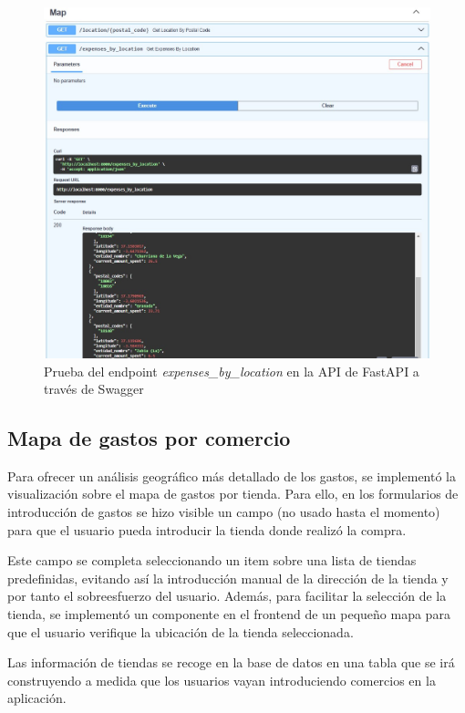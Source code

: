 \begin{figure}[ht!]
    \centering
    \includegraphics[width=\linewidth]{imagenes/api-expenses_by_location.jpg}
    \caption{Prueba del endpoint \textit{expenses\_by\_location} en la API de FastAPI a través de Swagger}
    \label{fig:api-expenses_by_location}
\end{figure}

\subsection{Mapa de gastos por comercio}
Para ofrecer un análisis geográfico más detallado de los gastos, se implementó la visualización sobre el mapa de gastos por tienda. Para ello, en los formularios de introducción de gastos se hizo visible un campo (no usado hasta el momento) para que el usuario pueda introducir la tienda donde realizó la compra. 

Este campo se completa seleccionando un item sobre una lista de tiendas predefinidas, evitando así la introducción manual de la dirección de la tienda y por tanto el sobreesfuerzo del usuario. Además, para facilitar la selección de la tienda, se implementó un componente en el frontend de un pequeño mapa para que el usuario verifique la ubicación de la tienda seleccionada.

Las información de tiendas se recoge en la base de datos en una tabla que se irá construyendo a medida que los usuarios vayan introduciendo comercios en la aplicación.


